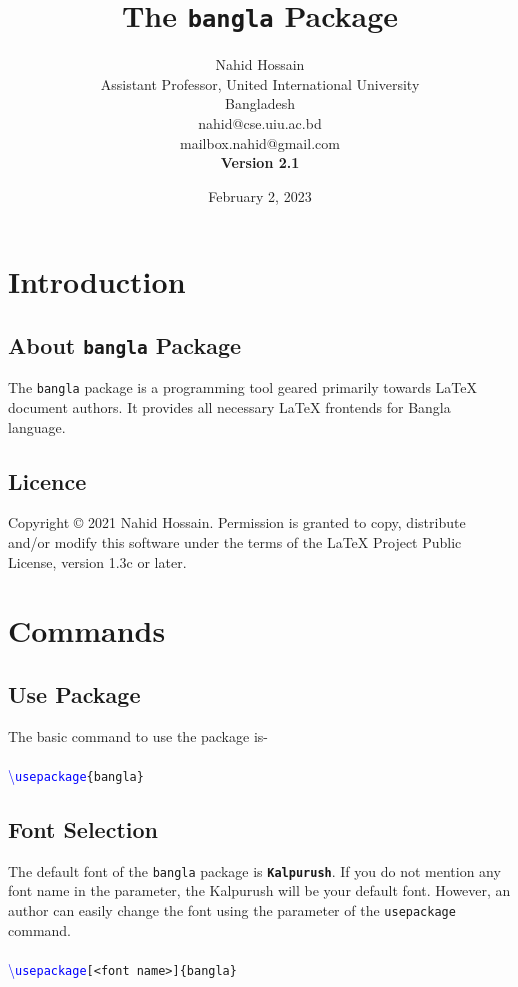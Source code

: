 \documentclass{article}
\newcommand{\com}[2]{\textcolor{blue}{\textbackslash\texttt{#1}}\texttt{#2}}
\begin{document}
\title{The \texttt{bangla} Package}

\author{Nahid Hossain \\Assistant Professor, United International University\\Bangladesh\\nahid@cse.uiu.ac.bd\\mailbox.nahid@gmail.com\\ \textbf{Version 2.1}}

\date{February 2, 2023}
\maketitle
\tableofcontents

\section{Introduction}
\subsection{About \texttt{bangla} Package}
The \texttt{bangla} package is a programming tool geared primarily towards LaTeX document authors. It provides all necessary LaTeX frontends for Bangla language.

\subsection{Licence}
Copyright © 2021 Nahid Hossain. Permission is granted to copy, distribute and/or modify this software under the terms of the LaTeX Project Public License, version 1.3c or later.
\section{Commands}
\subsection{Use Package}
The basic command to use the package is-\\ \\
\com{usepackage}{\{bangla\}}
    

\subsection{Font Selection}
The default font of the \texttt{bangla} package is \texttt{\textbf{Kalpurush}}. If you do not mention any font name in the parameter, the Kalpurush will be your default font. However, an author can easily change the font using the parameter of the \texttt{usepackage} command.
\\ \\ 
\com{usepackage}{[<font name>]\{bangla\}}
\\
\end{document}
